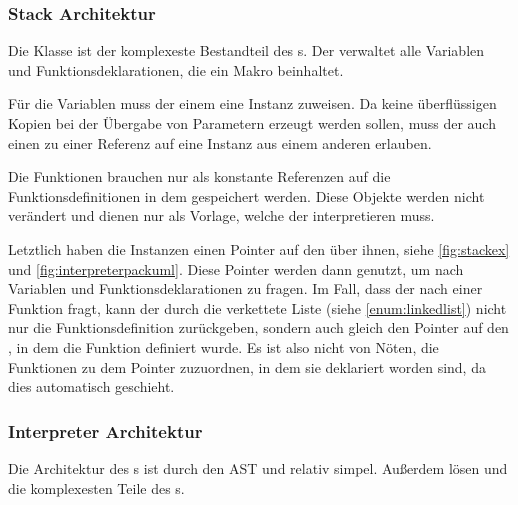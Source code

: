 {    %
    \subsubsection{Stack Architektur}
    \label{sssec:Stack Architektur}
      Die  Klasse ist der komplexeste Bestandteil des s. Der  verwaltet alle Variablen und Funktionsdeklarationen, die ein Makro beinhaltet.

      Für die Variablen muss der  einem  eine  Instanz zuweisen. Da keine überflüssigen Kopien bei der Übergabe von Parametern erzeugt werden sollen, muss der  auch einen  zu einer Referenz auf eine  Instanz aus einem anderen  erlauben.

      Die Funktionen brauchen nur als konstante Referenzen auf die Funktionsdefinitionen in dem  gespeichert werden. Diese Objekte werden nicht verändert und dienen nur als Vorlage, welche der  interpretieren muss.

      Letztlich haben die  Instanzen einen Pointer auf den  über ihnen, siehe \autoref{fig:stackex} und \autoref{fig:interpreterpackuml}. Diese Pointer werden dann genutzt, um nach Variablen und Funktionsdeklarationen zu fragen. Im Fall, dass der  nach einer Funktion fragt, kann der  durch die verkettete Liste (siehe \ref{enum:linkedlist}) nicht nur die Funktionsdefinition zurückgeben, sondern auch gleich den Pointer auf den , in dem die Funktion definiert wurde. Es ist also nicht von Nöten, die Funktionen zu dem  Pointer zuzuordnen, in dem sie deklariert worden sind, da dies automatisch geschieht.


    \subsubsection{Interpreter Architektur}
    \label{sssec:Interpreter Architektur}
      Die Architektur des s ist durch den AST und  relativ simpel. Außerdem lösen  und  die komplexesten Teile des s.

}

